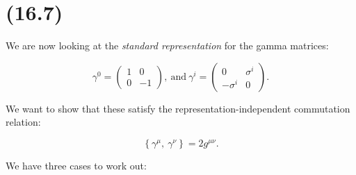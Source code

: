 \section{(16.7)}

We are now looking at the \textit{standard representation} for the gamma matrices:

\begin{equation}
    \gamma^0 = \begin{pmatrix}1 & 0 \\ 0 & -1\end{pmatrix},\ \text{and}\ \gamma^i = \begin{pmatrix}0 & \sigma^i \\ -\sigma^i & 0\end{pmatrix}.
\end{equation}


We want to show that these satisfy the representation-independent commutation relation:

\begin{equation}
    \left\{\gamma^{\mu},\ \gamma^{\nu}\right\} = 2g^{\mu\nu}.
\end{equation}

We have three cases to work out:

